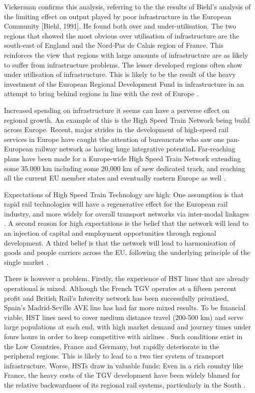 Vickerman confirms this analysis, referring to the the results of Biehl's analysis of the limiting effect on output played by poor infrastructure in the European Community [Biehl, 1991]. He found both over and under-utilisation. The two regions that showed the most obvious over utilisation of infrastructure are the south-east of England and the Nord-Pas de Calais region of France. This reinforces the view that regions with large amounts of infrastructure are as likely to suffer from infrastructure problems. The lesser developed regions often show under utilisation of infrastructure. This is likely to be the result of the heavy investment of the European Regional Development Fund in infrastructure in an attempt to bring behind regions in line with the rest of Europe \cite{Vickerman:1994}.

Increased spending on infrastructure it seems can have a perverse effect on regional growth. An example of this is the High Speed Train Network being build across Europe. Recent, major strides in the development of high-speed rail services in Europe have caught the attention of bureaucrats who saw one pan-European railway network as having huge integrative potentiaL Far-reaching plans have been made for a Europe-wide High Speed Train Network extending some 35.000 km including some 20,000 km of new dedicated track, and reaching all the current EU member states and eventually eastern Europe as well \cite{Ross:1994}.

Expectations of High Speed Train Technology are high: One assumption is that rapid rail technologies will have a regenerative effect for the European rail industry, and more widely for overall transport networks via inter-modal linkages \cite{ECCommission:1990}. A second reason for high expectations is the belief that the network will lead to an injection of capital and employment opportunities through regional development. A third belief is that the network will lead to harmonisation of goods and people carriers across the EU, following the underlying principle of the single market \cite{Ross, 1994}.

There is however a problem. Firstly, the experience of HST lines that are already operational is mixed. Although the French TGV operates at a fifteen percent profit and British Rail's Intercity network has been successfully privatised, Spain's Madrid-Seville AVE line has had far more mixed results. To be financial viable, HST lines need to cover medium distance travel (200-500 km) and serve large populations at each end, with high market demand and journey times under fours hours in order to keep competitive with airlines \cite{Blum:1992}. Such conditions exist in the Low Countries, France and Germany, but rapidly deteriorate in the peripheral regions. This is likely to lead to a two tier system of transport infrastructure. Worse, HSTs draw in valuable funds: Even in a rich country like France, the heavy costs of the TGV development have been widely blamed for the relative backwardness of its regional rail systems, particularly in the South \cite{Vickerman:1990}.


